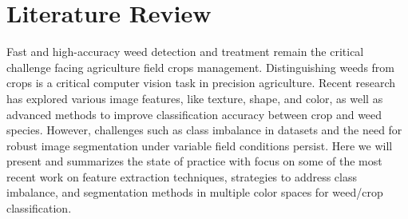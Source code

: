 \documentclass[letterpaper, notitlepage]{report}
\begin{document}
%
%
%
%
%


\chapter{Literature Review}
\label{section:literature}
 
Fast and high-accuracy weed detection and treatment remain the critical challenge facing agriculture field crops management. Distinguishing weeds from crops is a critical computer vision task in precision agriculture. Recent research has explored various image features, like texture, shape, and color, as well as advanced methods to improve classification accuracy between crop and weed species. However, challenges such as class imbalance in datasets and the need for robust image segmentation under variable field conditions persist. Here we will present and summarizes the state of practice with focus on some of the most recent work on feature extraction techniques, strategies to address class imbalance, and segmentation methods in multiple color spaces for weed/crop classification.
\end{document}
